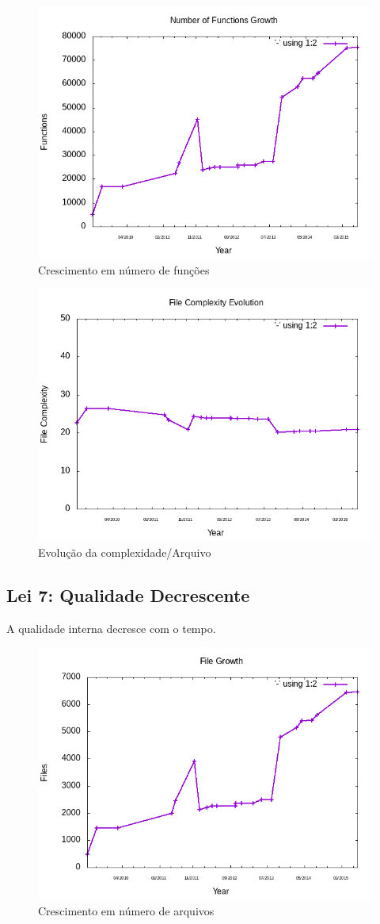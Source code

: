 \begin{figure}
	\centering
	\includegraphics[width=0.7\linewidth]{figure/Functions}
	\caption{Crescimento em número de funções}
	\label{fig:function_growth}
\end{figure}



\begin{figure}
	\centering
	\includegraphics[width=0.7\linewidth]{figure/file_complexity}
	\caption{Evolução da complexidade/Arquivo}
	\label{fig:file_complexity}
\end{figure}

\subsection{Lei 7: Qualidade Decrescente}

\begin{hypothesis}
	A qualidade interna decresce com o tempo.
\end{hypothesis}


\begin{figure}
	\centering
	\includegraphics[width=0.7\linewidth]{figure/Files}
	\caption{Crescimento em número de arquivos}
	\label{fig:files}
\end{figure}


